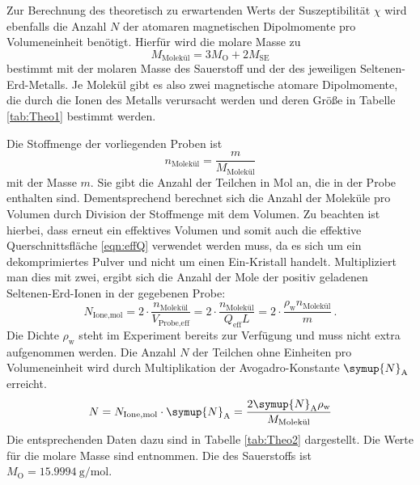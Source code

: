     Zur Berechnung des theoretisch zu erwartenden Werts der Suszeptibilität $\chi$ wird ebenfalls die Anzahl $N$ der atomaren magnetischen 
    Dipolmomente pro Volumeneinheit benötigt. 
    Hierfür wird die molare Masse zu 
    \begin{equation*}
        M_\text{Molekül}=3M_\text{O}+2M_\text{SE}
    \end{equation*}
    bestimmt mit der molaren Masse des Sauerstoff und der des jeweiligen Seltenen-Erd-Metalls. 
    Je Molekül gibt es also zwei magnetische atomare Dipolmomente, die durch die Ionen des Metalls verursacht werden und 
    deren Größe in Tabelle \ref{tab:Theo1} bestimmt werden.

    Die Stoffmenge der vorliegenden Proben ist 
    \begin{equation*}
        n_\text{Molekül}=\frac{m}{M_\text{Molekül}}
    \end{equation*}
    mit der Masse $m$. 
    Sie gibt die Anzahl der Teilchen in Mol an, die in der Probe enthalten sind. 
    Dementsprechend berechnet sich die Anzahl der Moleküle pro Volumen durch Division der Stoffmenge mit dem Volumen. 
    Zu beachten ist hierbei, dass erneut ein effektives Volumen und somit auch die effektive Querschnittsfläche \eqref{eqn:effQ} verwendet 
    werden muss, da es sich um ein dekomprimiertes Pulver und nicht um einen Ein-Kristall handelt.
    Multipliziert man dies mit zwei, ergibt sich die Anzahl der Mole der positiv geladenen Seltenen-Erd-Ionen in der gegebenen Probe:
    \begin{equation*}
        N_\text{Ione,mol}=2\cdot\frac{n_\text{Molekül}}{V_\text{Probe,eff}}=2\cdot\frac{n_\text{Molekül}}{Q_\text{eff}L}
        =2\cdot\frac{\rho _\text{w} n_\text{Molekül}}{m}\,.
    \end{equation*}
    Die Dichte $\rho _\text{w}$ steht im Experiment bereits zur Verfügung und muss nicht extra aufgenommen werden. 
    Die Anzahl $N$ der Teilchen ohne Einheiten pro Volumeneinheit wird durch Multiplikation der Avogadro-Konstante $\symup{N}_\text{A}$ erreicht.
    \begin{equation*}
        N=N_\text{Ione,mol}\cdot \symup{N}_\text{A}=\frac{2\symup{N}_\text{A}\rho_\text{w}}{M_\text{Molekül}}
    \end{equation*}
    Die entsprechenden Daten dazu sind in Tabelle \ref{tab:Theo2} dargestellt. 
    Die Werte für die molare Masse sind \cite[610]{kohlrausch} entnommen.
    Die des Sauerstoffs ist $M_\text{O}=\SI{15.9994}{\gram\per\mole}$.

